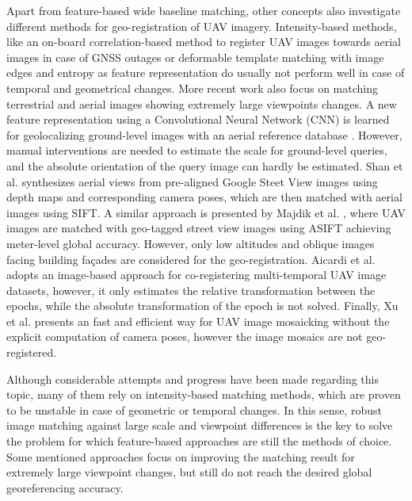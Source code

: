 Apart from feature-based wide baseline matching, other concepts also investigate different methods for geo-registration of UAV imagery.
Intensity-based methods, like an on-board correlation-based method to register UAV images towards aerial images in case of GNSS outages \cite{conte2009vision} or deformable template matching with image edges and entropy as feature representation \cite{fan2010registration} do usually not perform well in case of temporal and geometrical changes.
More recent work also focus on matching terrestrial and aerial images showing extremely large viewpoints changes.
A new feature representation using a Convolutional Neural Network (CNN) is learned for geolocalizing ground-level images with an aerial reference database \cite{lin2015learning}.
However, manual interventions are needed to estimate the scale for ground-level queries, and the absolute orientation of the query image can hardly be estimated.
Shan et al. \cite{shan2014accurate} synthesizes aerial views from pre-aligned Google Steet View images using depth maps and corresponding camera poses, which are then matched with aerial images using SIFT.
A similar approach is presented by Majdik et al. \cite{majdik2015air}, where UAV images are matched with geo-tagged street view images using ASIFT achieving meter-level global accuracy.
However, only low altitudes and oblique images facing building fa\c{c}ades are considered for the geo-registration.
Aicardi et al. \cite{aicardi2016image} adopts an image-based approach for co-registering multi-temporal UAV image datasets, however, it only estimates the relative transformation between the epochs, while the absolute transformation of the epoch is not solved.
Finally, Xu et al. \cite{xu2016mosaicking} presents an fast and efficient way for UAV image mosaicking without the explicit computation of camera poses, however the image mosaics are not geo-registered.


Although considerable attempts and progress have been made regarding this topic, many of them rely on intensity-based matching methods, which are proven to be unstable in case of geometric or temporal changes. 
In this sense, robust image matching against large scale and viewpoint differences is the key to solve the problem for which feature-based approaches are still the methods of choice.
Some mentioned approaches focus on improving the matching result for extremely large viewpoint changes, but still do not reach the desired global georeferencing accuracy.


